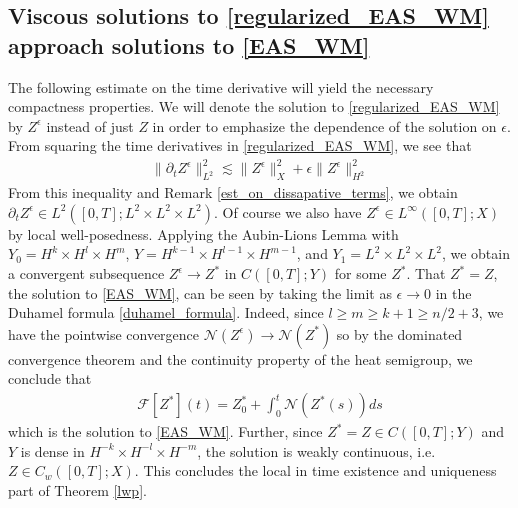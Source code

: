 \documentclass[11pt,letterpaper]{amsart}
\theoremstyle{plain}
\theoremstyle{definition}
\theoremstyle{remark}
\renewcommand{\geq}{\geqslant}
\begin{document}
\subsection{Viscous solutions to \eqref{regularized_EAS_WM} approach solutions to \eqref{EAS_WM}}
The following estimate on the time derivative will yield the necessary compactness properties. 
We will denote the solution to \eqref{regularized_EAS_WM} by $Z^{\epsilon}$ instead 
of just $Z$ in order to emphasize the dependence of the solution on $\epsilon$. 
From squaring the time derivatives in \eqref{regularized_EAS_WM}, we see that 
\begin{align*}
    \|\partial_t Z^{\epsilon}\|_{L^2}^2 \lesssim \|Z^{\epsilon}\|_X^2 + \epsilon \|Z^{\epsilon}\|_{H^2}^2
\end{align*}
From this inequality and Remark \ref{est_on_dissapative_terms}, 
we obtain $\partial_t Z^{\epsilon} \in L^2([0,T]; L^2 \times L^2 \times L^2)$. 
Of course we also have $Z^{\epsilon} \in L^{\infty}([0,T]; X)$ by local well-posedness. 
Applying the Aubin-Lions Lemma with $Y_0 = H^{k} \times H^{l} \times H^{m}$, 
$Y = H^{k-1} \times H^{l-1} \times H^{m-1}$, and $Y_1 = L^2 \times L^2 \times L^2$, we 
obtain a convergent subsequence $Z^{\epsilon} \to Z^*$ in $C([0,T]; Y)$ for some $Z^*$. 
That $Z^* = Z$, the solution to \eqref{EAS_WM}, can be seen by taking 
the limit as $\epsilon \to 0$ in the Duhamel formula \eqref{duhamel_formula}. 
Indeed, since $l \geq m \geq k+1 \geq n/2 + 3$, we have the pointwise convergence 
$\mathcal{N}(Z^{\epsilon}) \to \mathcal{N}(Z^*)$ so by the dominated convergence 
theorem and the continuity property of the heat semigroup, we conclude that 
\begin{align*}
    \mathcal{F}[Z^*](t) = Z^*_0 + \int_0^t \mathcal{N}(Z^*(s)) ds 
\end{align*}
which is the solution to \eqref{EAS_WM}.  
Further, since $Z^* = Z \in C([0,T]; Y)$ and $Y$ is dense in $H^{-k} \times H^{-l} \times H^{-m}$, 
the solution is weakly continuous, i.e. $Z \in C_w([0,T]; X)$. This concludes the 
local in time existence and uniqueness part of Theorem \ref{lwp}. 
\end{document}
